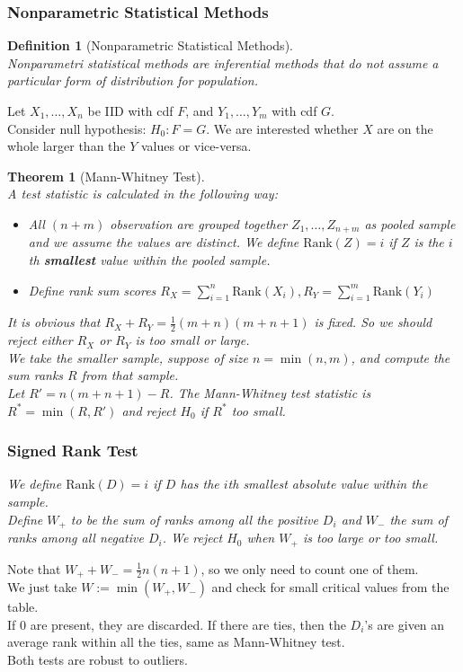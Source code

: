 \documentclass[12pt]{article}
\newtheorem{definition}{Definition}[section]
\newtheorem{theorem}{Theorem}[section]
\theoremstyle{definition}
\begin{document}
\subsubsection{Nonparametric Statistical Methods}
\begin{definition}[Nonparametric Statistical Methods]
\hfill\\\normalfont Nonparametri statistical methods are inferential methods that do not assume a particular form of distribution for population.
\end{definition}
Let $X_1,\ldots, X_n$ be IID with cdf $F$, and $Y_1,\ldots, Y_m$ with cdf $G$.\\
Consider null hypothesis: $H_0:F=G$. We are interested whether $X$ are on the whole larger than the $Y$ values or vice-versa.
\begin{theorem}[Mann-Whitney Test]
\hfill\\\normalfont A test statistic is calculated in the following way:
\begin{itemize}
  \item All $(n+m)$ observation are grouped together $Z_1,\ldots, Z_{n+m}$ as pooled sample and we assume the values are distinct. We define 
  $
\text{Rank}(Z)=i
  $
if $Z$ is the $i$th \textbf{smallest} value within the pooled sample.
\item Define rank sum scores
$
R_X=\sum_{i=1}^n \text{Rank}(X_i), R_Y=\sum_{i=1}^m\text{Rank}(Y_i)
$
\end{itemize}
It is obvious that $R_X+R_Y=\frac{1}{2}(m+n)(m+n+1)$ is fixed. So we should reject either $R_X$ or $R_Y$ is too small or large. \\
We take the smaller sample, suppose of size $n=\min(n,m)$, and compute the sum ranks $R$ from that sample.\\
Let $R'=n(m+n+1)-R$. The Mann-Whitney test statistic is
$
R^\ast = \min(R,R')
$
and reject $H_0$ if $R^\ast$ too small.
\subsubsection{Signed Rank Test}
We define 
$
\text{Rank}(D)=i
$
if $D$ has the $i$th smallest absolute value within the sample.\\
Define $W_{+}$ to be the sum of ranks among all the positive $D_i$ and $W_{-}$ the sum of ranks among all negative $D_i$. We reject $H_0$ when $W_{+}$ is too large or too small.
\end{theorem}
Note that $W_{+}+W_{-}=\frac{1}{2}n(n+1)$, so we only need to count one of them.\\
We just take $W:=\min(W_{+},W_{-})$ and check for small critical values from the table.\\
If $0$ are present, they are discarded. If there are ties, then the $D_i$'s are given an average rank within all the ties, same as Mann-Whitney test.\\

Both tests are robust to outliers.
\end{document}
